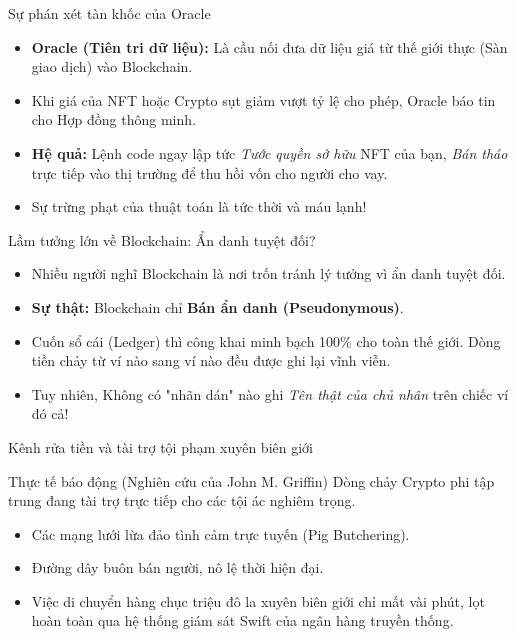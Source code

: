 \documentclass[aspectratio=169, 12pt]{beamer}
\begin{document}
\begin{frame}{Sự phán xét tàn khốc của Oracle}
    \begin{itemize}
        \item \textbf{Oracle (Tiên tri dữ liệu):} Là cầu nối đưa dữ liệu giá từ thế giới thực (Sàn giao dịch) vào Blockchain.
        \item Khi giá của NFT hoặc Crypto sụt giảm vượt tỷ lệ cho phép, Oracle báo tin cho Hợp đồng thông minh.
        \item \textbf{Hệ quả:} Lệnh code ngay lập tức \textit{Tước quyền sở hữu} NFT của bạn, \textit{Bán tháo} trực tiếp vào thị trường để thu hồi vốn cho người cho vay. 
        \item Sự trừng phạt của thuật toán là tức thời và máu lạnh!
    \end{itemize}
\end{frame}

\begin{frame}{Lầm tưởng lớn về Blockchain: Ẩn danh tuyệt đối?}
    \begin{itemize}
        \item Nhiều người nghĩ Blockchain là nơi trốn tránh lý tưởng vì ẩn danh tuyệt đối.
        \item \textbf{Sự thật:} Blockchain chỉ \textbf{Bán ẩn danh (Pseudonymous)}.
        \item Cuốn sổ cái (Ledger) thì công khai minh bạch 100\% cho toàn thế giới. Dòng tiền chảy từ ví nào sang ví nào đều được ghi lại vĩnh viễn.
        \item Tuy nhiên, Không có "nhãn dán" nào ghi \textit{Tên thật của chủ nhân} trên chiếc ví đó cả!
    \end{itemize}
\end{frame}

\begin{frame}{Kênh rửa tiền và tài trợ tội phạm xuyên biên giới}
    \begin{block}{Thực tế báo động (Nghiên cứu của John M. Griffin)}
        Dòng chảy Crypto phi tập trung đang tài trợ trực tiếp cho các tội ác nghiêm trọng.
    \end{block}
    \begin{itemize}
        \item Các mạng lưới lừa đảo tình cảm trực tuyến (Pig Butchering).
        \item Đường dây buôn bán người, nô lệ thời hiện đại.
        \item Việc di chuyển hàng chục triệu đô la xuyên biên giới chỉ mất vài phút, lọt hoàn toàn qua hệ thống giám sát Swift của ngân hàng truyền thống.
    \end{itemize}
\end{frame}
\end{document}
